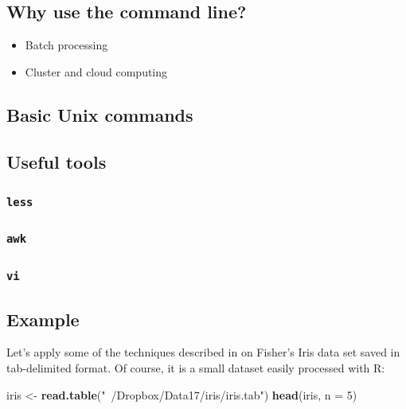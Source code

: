 \documentclass[]{book}
\newenvironment{Shaded}{\begin{snugshade}}{\end{snugshade}}
\newcommand{\KeywordTok}[1]{\textcolor[rgb]{0.13,0.29,0.53}{\textbf{#1}}}
\newcommand{\DataTypeTok}[1]{\textcolor[rgb]{0.13,0.29,0.53}{#1}}
\newcommand{\DecValTok}[1]{\textcolor[rgb]{0.00,0.00,0.81}{#1}}
\newcommand{\StringTok}[1]{\textcolor[rgb]{0.31,0.60,0.02}{#1}}
\newcommand{\NormalTok}[1]{#1}
\theoremstyle{definition}
\theoremstyle{definition}
\theoremstyle{definition}
\theoremstyle{remark}
\begin{document}
\subsection{Why use the command line?}\label{why-use-the-command-line}

\begin{itemize}
\item
  Batch processing
\item
  Cluster and cloud computing
\end{itemize}

\subsection{Basic Unix commands}\label{basic-unix-commands}

\subsection{Useful tools}\label{useful-tools}

\subsubsection{\texorpdfstring{\texttt{less}}{less}}\label{less}

\subsubsection{\texorpdfstring{\texttt{awk}}{awk}}\label{awk}

\subsubsection{\texorpdfstring{\texttt{vi}}{vi}}\label{vi}

\subsection{Example}\label{example}

Let's apply some of the techniques described in \citet{Blackwell2012} on
Fisher's Iris data set saved in tab-delimited format. Of course, it is a
small dataset easily processed with R:

\begin{Shaded}
\begin{Highlighting}[]
\NormalTok{iris <-}\StringTok{ }\KeywordTok{read.table}\NormalTok{(}\StringTok{"~/Dropbox/Data17/iris/iris.tab"}\NormalTok{)}
\KeywordTok{head}\NormalTok{(iris, }\DataTypeTok{n =} \DecValTok{5}\NormalTok{)}
\end{Highlighting}
\end{Shaded}
\end{document}
